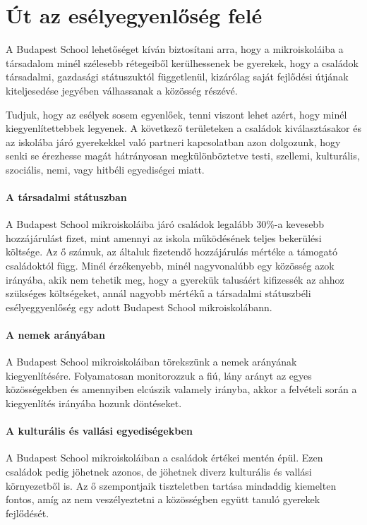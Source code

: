 \section{Út az esélyegyenlőség felé}
\label{sec:ut_az_eselyegyenloseg_fele}
A Budapest School lehetőséget kíván biztosítani arra, hogy a
mikroiskoláiba a társadalom minél szélesebb rétegeiből kerülhessenek be
gyerekek, hogy a családok társadalmi, gazdasági státuszuktól
függetlenül, kizárólag saját fejlődési útjának kiteljesedése jegyében
válhassanak a közösség részévé.

Tudjuk, hogy az esélyek sosem egyenlőek, tenni viszont lehet azért, hogy
minél kiegyenlítettebbek legyenek. A következő területeken a családok
kiválasztásakor és az iskolába járó gyerekekkel való partneri
kapcsolatban azon dolgozunk, hogy senki se érezhesse magát hátrányosan
megkülönböztetve testi, szellemi, kulturális, szociális, nemi, vagy
hitbéli egyediségei miatt.

\paragraph{A társadalmi státuszban}

  A Budapest School mikroiskoláiba járó családok legalább 30\%-a
  kevesebb hozzájárulást fizet, mint amennyi az iskola működésének
  teljes bekerülési költsége. Az ő számuk, az általuk fizetendő
  hozzájárulás mértéke a támogató családoktól függ. Minél érzékenyebb,
  minél nagyvonalúbb egy közösség azok irányába, akik nem tehetik meg,
  hogy a gyerekük talusáért kifizessék az ahhoz szükséges költségeket,
  annál nagyobb mértékű a társadalmi státuszbéli esélyeggyenlőség egy
  adott Budapest School mikroiskolábann.


\paragraph{A nemek arányában}


  A Budapest School mikroiskoláiban törekszünk a nemek arányának
  kiegyenlítésére. Folyamatosan monitorozzuk a fiú, lány arányt az egyes
  közösségekben és amennyiben elcúszik valamely irányba, akkor a
  felvételi során a kiegyenlítés irányába hozunk döntéseket.


\paragraph{A kulturális és vallási egyediségekben}


  A Budapest School mikroiskoláiban a családok értékei mentén épül. Ezen
  családok pedig jöhetnek azonos, de jöhetnek diverz kulturális és
  vallási környezetből is. Az ő szempontjaik tiszteletben tartása
  mindaddig kiemelten fontos, amíg az nem veszélyeztetni a közösségben
  együtt tanuló gyerekek fejlődését.


